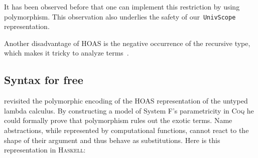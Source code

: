 \documentclass[9pt,preprint,authoryear]{sigplanconf}
\begin{document}
%
It has been observed before that one can implement this restriction
    by using polymorphism. This observation also underlies the safety of
    our{~}\textcolor[rgb]{0,0,0.80}{\texttt{UnivScope}} representation.%


%
Another disadvantage of HOAS is the negative occurrence
    of the recursive type, which makes it tricky to analyze
    terms{~}\cite{washburn_boxes_2003}.%


\subsection{Syntax for free}

%
\citet{atkey-hoas-09} revisited the polymorphic encoding
    of the HOAS representation of the untyped lambda calculus. By
    constructing a model of System F{'}s parametricity in \textsc{Coq} he could
    formally prove that polymorphism rules out the exotic terms.
    Name abstractions, while represented by computational functions,
    cannot react to the shape of their argument and thus
    behave as substitutions. Here is this representation in \textsc{Haskell}{:}%


{\nopagebreak }
\end{document}
